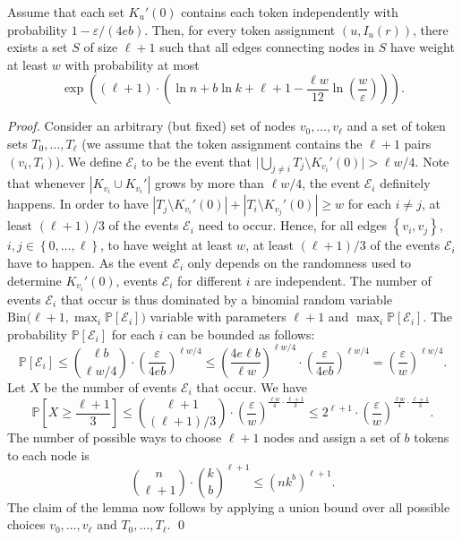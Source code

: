 \documentclass{llncs}
\newcommand{\set}[1]{\left\{#1\right\}}
\renewcommand{\Pr}{\mathbb{P}}
\newcommand{\eps}{\varepsilon}
\begin{document}
\begin{lemma}\label{lemma:cliques}
    Assume that each set $K_u'(0)$ contains each token independently
    with probability $1-\eps/(4e b)$. Then, for every token assignment
    $(u,I_u(r))$, there exists a set $S$ of size $\ell+1$ such that
    all edges connecting nodes in $S$ have weight at least $w$ with
    probability at most
    \[
    \exp\left((\ell+1)\cdot\left(
            \ln n + b\ln k + \ell+1 - 
            \frac{\ell w}{12}\ln\left(\frac{w}{\eps}\right)
        \right)\right).
    \]
\end{lemma}
\begin{proof}
    Consider an arbitrary (but fixed) set of nodes $v_0,\dots,v_\ell$
    and a set of token sets $T_0,\dots,T_\ell$ (we assume that the
    token assignment contains the $\ell+1$ pairs $(v_i,T_i)$). We
    define $\mathcal{E}_i$ to be the event that $\big|\bigcup_{j\neq
        i} T_j\setminus K_{v_i}'(0)\big|> \ell w /4$. Note that
    whenever $|K_{v_i}\cup K_{v_i}'|$ grows by more than $\ell w/4$,
    the event $\mathcal{E}_i$ definitely happens. In order to have
    $|T_j\setminus K_{v_i}'(0)|+|T_i\setminus K_{v_j}'(0)|\geq w$ for
    each $i\neq j$, at least $(\ell+1)/3$ of the events
    $\mathcal{E}_i$ need to occur. Hence, for all edges
    $\set{v_i,v_j}$, $i,j\in\set{0,\dots,\ell}$, to have weight at
    least $w$, at least $(\ell+1)/3$ of the events $\mathcal{E}_i$
    have to happen. As the event $\mathcal{E}_i$ only depends on the
    randomness used to determine $K_{v_i}'(0)$, events $\mathcal{E}_i$
    for different $i$ are independent. The number of events
    $\mathcal{E}_i$ that occur is thus dominated by a binomial random
    variable $\mathrm{Bin}\big(\ell+1,\max_i\Pr[\mathcal{E}_i]\big)$
    variable with parameters $\ell+1$ and
    $\max_i\Pr[\mathcal{E}_i]$. The probability $\Pr[\mathcal{E}_i]$
    for each $i$ can be bounded as follows:
    \[
    \Pr[\mathcal{E}_i] \leq {\ell b\choose \ell w/4} \cdot
    \left(\frac{\eps}{4e b}\right)^{\ell w/4} \leq
    \left(\frac{4e\ell b}{\ell w}\right)^{\ell
        w/4}\cdot\left(\frac{\eps}{4e b}\right)^{\ell w /4} =
    \left(\frac{\eps}{w}\right)^{\ell w /4}.
    \]
    Let $X$ be the number of events $\mathcal{E}_i$ that occur. We
    have
    \[
    \Pr\left[X\geq \frac{\ell+1}{3}\right] \leq 
    {\ell+1\choose (\ell+1)/3}\cdot
    \left(\frac{\eps}{w}\right)^{\frac{\ell w}{4}\cdot \frac{\ell+1}{3}}
    \leq
    2^{\ell+1}\cdot
    \left(\frac{\eps}{w}\right)^{\frac{\ell w}{4}\cdot \frac{\ell+1}{3}}.
    \]
    The number of possible ways to choose $\ell+1$ nodes and assign a
    set of $b$ tokens to each node is
    \[
    {n\choose \ell+1}\cdot {k\choose b}^{\ell+1} \leq 
    \left(n k^b\right)^{\ell+1}.
    \]
    The claim of the lemma now follows by applying a union bound over
    all possible choices $v_0,\dots,v_\ell$ and $T_0,\dots,T_\ell$.
\hspace*{\fill}\qed\end{proof}
\end{document}
